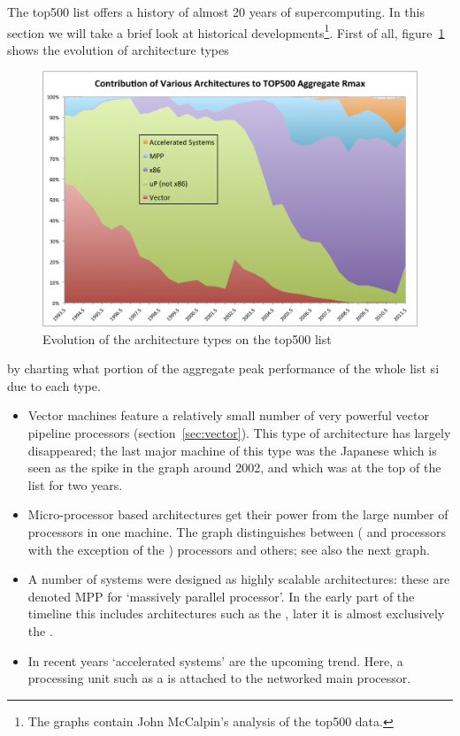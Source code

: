 The top500 list offers a history of almost 20 years of
supercomputing. In this section we will take a brief look at
historical developments\footnote{The graphs contain John McCalpin's
  analysis of the top500 data.}. First of all,
figure~\ref{fig:top500-types} shows the evolution of architecture types
\begin{figure}[ht]
  \includegraphics[scale=.6]{graphics-public/top500/ChartByArchitecture}
  \caption{Evolution of the architecture types on the top500 list}
  \label{fig:top500-types}
\end{figure}
by charting what portion of the aggregate peak performance of the
whole list si due to each type.
\begin{itemize}
\item Vector machines feature a relatively small number of very powerful vector
  pipeline processors (section~\ref{sec:vector}). This type of
  architecture has largely disappeared; the last major machine of this
  type was the Japanese  which is seen as
  the spike in the graph around 2002, and which was at the top of the
  list for two years.
\item Micro-processor based architectures get their power from the
  large number of processors in one machine. The graph distinguishes
  between  ( and 
  processors with the exception of the )
  processors and others; see also the next graph.
\item A number of systems were designed as highly scalable
  architectures: these are denoted MPP for `massively parallel
  processor'. In the early part of the timeline this includes
  architectures such as the , later it
  is almost exclusively the .
\item In recent years `accelerated systems' are the upcoming
  trend. Here, a processing unit such as a  is attached
  to the networked main processor.
\end{itemize}

